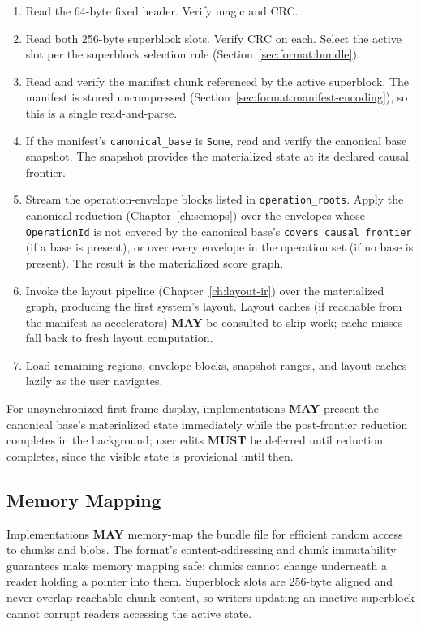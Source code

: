 \documentclass[11pt,letterpaper]{report}
\newcounter{requirement}[chapter]
\newcommand{\MUST}{\textbf{MUST}}
\newcommand{\MAY}{\textbf{MAY}}
\begin{document}
\begin{enumerate}
  \item Read the 64-byte fixed header. Verify magic and CRC.
  \item Read both 256-byte superblock slots. Verify CRC on each.
    Select the active slot per the superblock selection rule
    (Section~\ref{sec:format:bundle}).
  \item Read and verify the manifest chunk referenced by the
    active superblock. The manifest is stored uncompressed
    (Section~\ref{sec:format:manifest-encoding}), so this is a
    single read-and-parse.
  \item If the manifest's \texttt{canonical\_base} is
    \texttt{Some}, read and verify the canonical base snapshot.
    The snapshot provides the materialized state at its declared
    causal frontier.
  \item Stream the operation-envelope blocks listed in
    \texttt{operation\_roots}. Apply the canonical reduction
    (Chapter~\ref{ch:semops}) over the envelopes whose
    \texttt{OperationId} is not covered by the canonical base's
    \texttt{covers\_causal\_frontier} (if a base is present), or
    over every envelope in the operation set (if no base is
    present). The result is the materialized score graph.
  \item Invoke the layout pipeline (Chapter~\ref{ch:layout-ir})
    over the materialized graph, producing the first system's
    layout. Layout caches (if reachable from the manifest as
    accelerators) \MAY{} be consulted to skip work; cache misses
    fall back to fresh layout computation.
  \item Load remaining regions, envelope blocks, snapshot ranges,
    and layout caches lazily as the user navigates.
\end{enumerate}

For unsynchronized first-frame display, implementations \MAY{}
present the canonical base's materialized state immediately while
the post-frontier reduction completes in the background; user
edits \MUST{} be deferred until reduction completes, since the
visible state is provisional until then.

\subsection{Memory Mapping}

\begin{requirement}
  \label{req:format:safe-memory-mapping}
  Implementations \MAY{} memory-map the bundle file for efficient
  random access to chunks and blobs. The format's content-addressing
  and chunk immutability guarantees make memory mapping safe:
  chunks cannot change underneath a reader holding a pointer into
  them. Superblock slots are 256-byte aligned and never overlap
  reachable chunk content, so writers updating an inactive
  superblock cannot corrupt readers accessing the active state.
\end{requirement}
\end{document}
